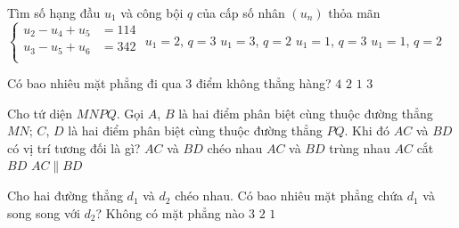 \begin{ex}%
Tìm số hạng đầu  $u_1$ và công bội $q$ của cấp số nhân $(u_n)$  thỏa mãn 
$\begin{cases}
u_2-u_4+u_5&= 114 \\
u_3-u_5+u_6 &= 342 \\
\end{cases}$
	\choice
	{\True $u_1=2$, $q=3$}
	{$u_1=3$, $q=2$}
	{$u_1=1$, $q=3$}
	{$u_1=1$, $q=2$}
\end{ex}
\begin{ex}%
Có bao nhiêu mặt phẳng đi qua $3$ điểm không thẳng hàng?	
	\choice
	{$4$}
	{$2$}
	{\True $1$}
	{$3$}
\end{ex}
\begin{ex}%
Cho tứ diện $MNPQ$. Gọi $A$, $B$ là hai điểm phân biệt cùng thuộc đường thẳng $MN$; $C$, $D$ là hai điểm phân biệt cùng thuộc đường thẳng $PQ$. Khi đó $AC$ và $BD$ có vị trí tương đối là	gì?
	\choice
	{\True $AC$ và $BD$ chéo nhau}
	{$AC$ và $BD$ trùng nhau}
	{$AC$ cắt $BD$}
	{$AC\parallel BD$}
\end{ex}
\begin{ex}%
Cho hai đường thẳng $d_1$  và $d_2$  chéo nhau. Có bao nhiêu mặt phẳng chứa $d_1$ và song song với $d_2$?	
	\choice
	{Không có mặt phẳng nào}
	{$3$}
	{$2$}
	{\True $1$}
\end{ex}
